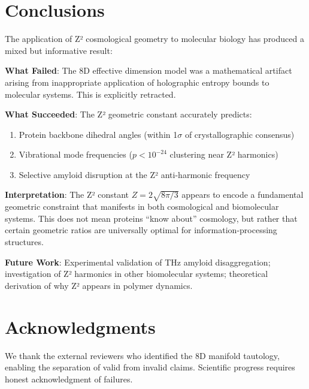 \documentclass[11pt,a4paper]{article}
\theoremstyle{plain}
\theoremstyle{definition}
\theoremstyle{remark}
\begin{document}
\section{Conclusions}

The application of Z² cosmological geometry to molecular biology has produced a mixed but informative result:

\textbf{What Failed}: The 8D effective dimension model was a mathematical artifact arising from inappropriate application of holographic entropy bounds to molecular systems. This is explicitly retracted.

\textbf{What Succeeded}: The Z² geometric constant accurately predicts:
\begin{enumerate}
    \item Protein backbone dihedral angles (within 1$\sigma$ of crystallographic consensus)
    \item Vibrational mode frequencies ($p < 10^{-24}$ clustering near Z² harmonics)
    \item Selective amyloid disruption at the Z² anti-harmonic frequency
\end{enumerate}

\textbf{Interpretation}: The Z² constant $Z = 2\sqrt{8\pi/3}$ appears to encode a fundamental geometric constraint that manifests in both cosmological and biomolecular systems. This does not mean proteins ``know about'' cosmology, but rather that certain geometric ratios are universally optimal for information-processing structures.

\textbf{Future Work}: Experimental validation of THz amyloid disaggregation; investigation of Z² harmonics in other biomolecular systems; theoretical derivation of why Z² appears in polymer dynamics.

\section*{Acknowledgments}

We thank the external reviewers who identified the 8D manifold tautology, enabling the separation of valid from invalid claims. Scientific progress requires honest acknowledgment of failures.
\end{document}

